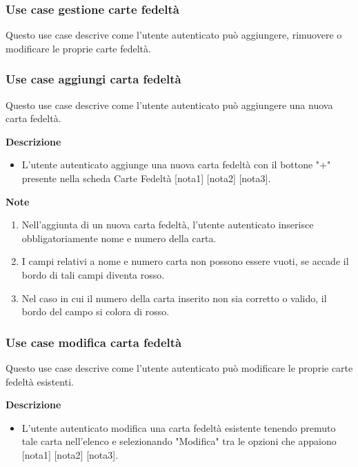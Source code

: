 \documentclass[a4paper,12pt]{article}
\begin{document}
\subsubsection*{Use case gestione carte fedeltà}

 Questo use case descrive come l'utente autenticato può aggiungere, rimuovere o modificare le proprie carte fedeltà.
 




\subsubsection*{Use case aggiungi carta fedeltà}

 Questo use case descrive come l'utente autenticato può aggiungere una nuova carta fedeltà.
 
\textbf{Descrizione}
\begin{itemize} \setlength\itemsep{0.01em}
\item L'utente autenticato aggiunge una nuova carta fedeltà con il bottone "+" presente nella scheda Carte Fedeltà [nota1] [nota2] [nota3].
\end{itemize}

\textbf{Note}
\begin{enumerate} \setlength\itemsep{0.01em}
\item Nell'aggiunta di un nuova carta fedeltà, l'utente autenticato inserisce obbligatoriamente nome e numero della carta.
\item I campi relativi a nome e numero carta non possono essere vuoti, se accade il bordo di tali campi diventa rosso.
\item Nel caso in cui il numero della carta inserito non sia corretto o valido, il bordo del campo si colora di rosso.
\end{enumerate}




\subsubsection*{Use case modifica carta fedeltà}

 Questo use case descrive come l'utente autenticato può modificare le proprie carte fedeltà esistenti.
 
\textbf{Descrizione}
\begin{itemize} \setlength\itemsep{0.01em}
\item L'utente autenticato modifica una carta fedeltà esistente tenendo premuto tale carta nell'elenco e selezionando "Modifica" tra le opzioni che appaiono [nota1] [nota2] [nota3].
\end{itemize}
\end{document}
